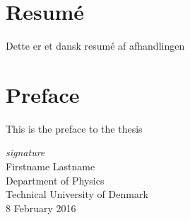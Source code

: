 \chapter*{Resum\'e}
Dette er et dansk resum\'e af afhandlingen
\\[20mm]

\chapter*{Preface}
This is the preface to the thesis
\\[15mm]

\begin{center}
\emph{signature}\\[2mm]
Firstname Lastname\\
Department of Physics\\
Technical University of Denmark\\
8 February 2016 
\end{center}


\tableofcontents



\listoffigures
{}

\listoftables
{}


